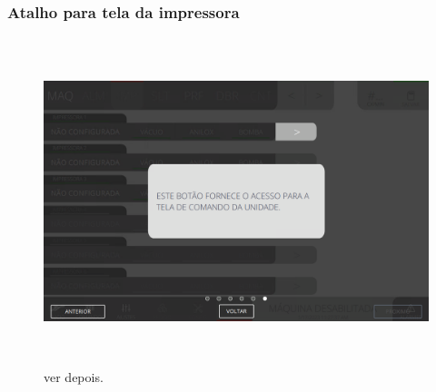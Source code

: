 \newpage
\thispagestyle{fancy}
\vspace*{\fill}
\subsubsection{\small{Atalho para tela da impressora}}
\begin{figure}[h]
  \centering
  \includegraphics[width=576px,height=360px]{src/images/04-printter/01-printters/commands/e-6.png}
  \caption{ver depois.}
   \label{}
\end{figure}
\vspace*{\fill}

